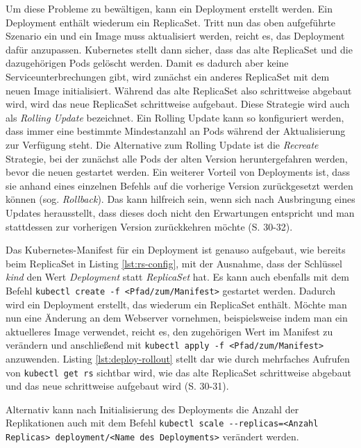 \documentclass[11pt,a4paper]{article}
\begin{document}
Um diese Probleme zu bewältigen, kann ein Deployment erstellt werden.
Ein Deployment enthält wiederum ein ReplicaSet. Tritt nun das oben aufgeführte Szenario ein und ein Image
muss aktualisiert werden, reicht es, das Deployment dafür anzupassen.
Kubernetes stellt dann sicher, dass das alte ReplicaSet und die dazugehörigen Pods gelöscht werden.
Damit es dadurch aber keine Serviceunterbrechungen gibt, wird zunächst ein anderes ReplicaSet mit dem neuen
Image initialisiert. Während das alte ReplicaSet also schrittweise abgebaut wird, wird das neue ReplicaSet
schrittweise aufgebaut. Diese Strategie wird auch als \emph{Rolling Update} bezeichnet.
Ein Rolling Update kann so konfiguriert werden, dass immer eine bestimmte Mindestanzahl an
Pods während der Aktualisierung zur Verfügung steht.
Die Alternative zum Rolling Update ist die \emph{Recreate} Strategie, bei der zunächst
alle Pods der alten Version heruntergefahren werden, bevor die neuen gestartet werden.
Ein weiterer Vorteil von Deployments ist, dass sie anhand eines einzelnen Befehls auf die vorherige Version
zurückgesetzt werden können (sog. \emph{Rollback}). Das kann hilfreich sein, wenn sich nach Ausbringung eines
Updates herausstellt, dass dieses doch nicht den Erwartungen entspricht und man stattdessen zur vorherigen
Version zurückkehren möchte \cite{Schmeling_Dargatz_2022} (S. 30-32).

Das Kubernetes-Manifest für ein Deployment ist genauso aufgebaut, wie bereits beim ReplicaSet in
Listing \ref{lst:rs-config}, mit der Ausnahme, dass der Schlüssel \emph{kind} den Wert
\emph{Deployment} statt \emph{ReplicaSet} hat. Es kann auch ebenfalls mit dem Befehl
\lstinline|kubectl create -f <Pfad/zum/Manifest>| gestartet werden.
Dadurch wird ein Deployment erstellt, das wiederum ein ReplicaSet enthält.
Möchte man nun eine Änderung an dem Webserver vornehmen, beispielsweise indem
man ein aktuelleres Image verwendet, reicht es, den zugehörigen Wert im Manifest
zu verändern und anschließend mit \lstinline|kubectl apply -f <Pfad/zum/Manifest>| anzuwenden.
Listing \ref{lst:deploy-rollout} stellt dar wie durch mehrfaches Aufrufen
von \lstinline|kubectl get rs| sichtbar wird, wie das alte
ReplicaSet schrittweise abgebaut und das neue schrittweise aufgebaut wird \cite{Schmeling_Dargatz_2022} (S. 30-31).

Alternativ kann nach Initialisierung des Deployments die Anzahl der Replikationen auch mit
dem Befehl \lstinline|kubectl scale --replicas=<Anzahl Replicas> deployment/<Name des Deployments>|
verändert werden.
\end{document}
